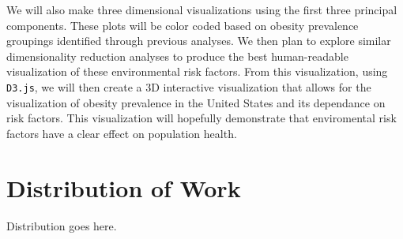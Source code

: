 \documentclass{article}
\begin{document}
We will also make three dimensional visualizations using the first three principal components.
These plots will be color coded based on obesity prevalence groupings identified through previous analyses.
We then plan to explore similar dimensionality reduction analyses to produce the best human-readable visualization of these environmental risk factors. 
From this visualization, using \verb|D3.js|, we will then create a 3D interactive visualization that allows for the visualization of obesity prevalence in the United States and its dependance on risk factors. This visualization will hopefully demonstrate that enviromental risk factors have a clear effect on population health.

\section{Distribution of Work}
\label{distribution}

Distribution goes here.




\end{document}
